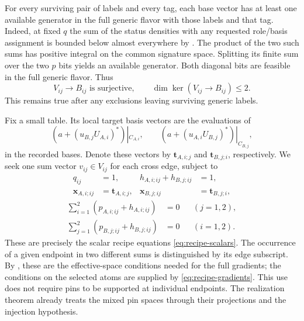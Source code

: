 For every surviving pair of labels and every tag, each base vector has
at least one available generator in the full generic flavor with those
labels and that tag. Indeed, at fixed $q$
the sum of the status densities with any requested role/basis assignment
is bounded below almost everywhere by
. The product of the two such sums has positive
integral on the common signature space. Splitting its finite sum over
the two $p$ bits yields an available generator. Both diagonal bits are
feasible in the full generic flavor. Thus
\begin{equation}
\label{eq:status-full-projection}
V_{ij}\longrightarrow B_{ij}\text{ is surjective},\qquad
\dim\ker(V_{ij}\longrightarrow B_{ij})\le2.
\end{equation}
This remains true after any exclusions leaving surviving generic labels.

Fix a small table. Its local target basis vectors are the evaluations of
\[
(a+(u_{B,j}U_{A,i})^*)|_{C_{A,i}},\qquad
(a+(u_{A,i}U_{B,j})^*)|_{C_{B,j}},
\]
in the recorded bases. Denote these vectors by
$\mathbf t_{A,i;j}$ and $\mathbf t_{B,j;i}$, respectively. We seek one
sum vector $v_{ij}\in V_{ij}$ for each cross edge, subject to
\begin{equation}
\label{eq:status-local-targets}
\begin{aligned}
q_{ij}&=1,& h_{A,i;ij}+h_{B,j;ij}&=1,\\
\mathbf x_{A,i;ij}&=\mathbf t_{A,i;j},&
\mathbf x_{B,j;ij}&=\mathbf t_{B,j;i},
\end{aligned}
\end{equation}
\begin{equation}
\label{eq:status-coupled-targets}
\begin{aligned}
\sum_{i=1}^2(p_{A,i;ij}+h_{A,i;ij})&=0 &&(j=1,2),\\
\sum_{j=1}^2(p_{B,j;ij}+h_{B,j;ij})&=0 &&(i=1,2).
\end{aligned}
\end{equation}
These are precisely the scalar recipe equations
\eqref{eq:recipe-scalars}. The occurrence of a given endpoint in two
different sums is distinguished by its edge subscript.
By , these are the effective-space
conditions needed for the full gradients; the conditions on the selected atoms
are supplied by \eqref{eq:recipe-gradients}. This use does not require
pins to be supported at individual endpoints. The realization theorem
already treats the mixed pin spaces through their projections and the
injection hypothesis.

